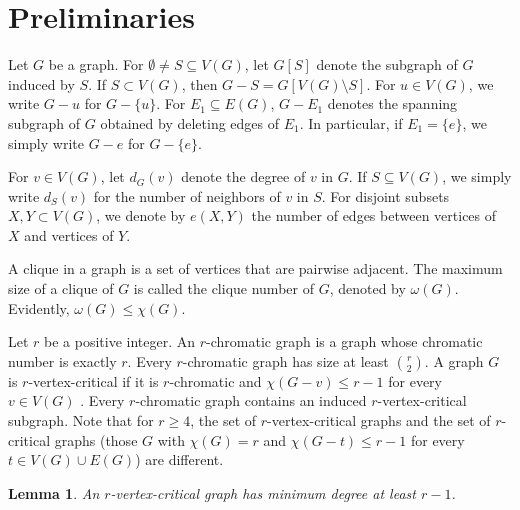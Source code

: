 \documentclass[10pt,a4paper]{amsart}
\newtheorem{lemma}{Lemma}[section]
\begin{document}
\section{Preliminaries}

Let $G$ be a graph. For $\emptyset\ne S\subseteq V(G)$, let $G[S]$ denote the subgraph of $G$ induced by $S$. If $S\subset V(G)$, then $G-S=G[V(G)\setminus S]$.
For $u\in V(G)$, we write $G-u$ for $G-\{u\}$. 
For $E_1\subseteq E(G)$, $G-E_1$ denotes the spanning subgraph of $G$ obtained by deleting edges of $E_1$. In particular, if $E_1=\{e\}$, we simply write $G-e$ for $G-\{e\}$.


For $v\in V(G)$, let $d_G(v)$ denote the degree of $v$ in $G$. If $S\subseteq V(G)$, we  simply write $d_S(v)$ for the number of neighbors of $v$ in $S$. %
For disjoint subsets $X,Y\subset V(G)$, we denote by $e(X,Y)$ the number of edges between vertices of $X$ and vertices of $Y$.

 
A clique in a graph is a set of vertices that are pairwise adjacent. The maximum size of a clique of $G$ is called the clique number of $G$, denoted by $\omega(G)$. Evidently, $\omega(G)\le \chi(G)$. 

Let $r$ be a positive integer. An $r$-chromatic graph is a graph whose chromatic number is exactly $r$. Every $r$-chromatic graph has size at least ${r\choose 2}$. 
A graph $G$ is $r$-vertex-critical if it is $r$-chromatic and  
$\chi(G-v)\le r-1$ for every $v\in V(G)$ \cite{Jen}.  
Every $r$-chromatic graph contains an induced
$r$-vertex-critical subgraph. 
Note that  for $r\ge 4$, the set of  $r$-vertex-critical graphs and the  set of $r$-critical graphs (those $G$ with $\chi (G)=r$ and  $\chi(G-t)\le r-1$ for every $t\in V(G)\cup E(G)$) are different.




%
%

\begin{lemma}\label{edge} \cite{Jen}
An $r$-vertex-critical graph has minimum degree at least $r-1$.  
\end{lemma}


\end{document}
